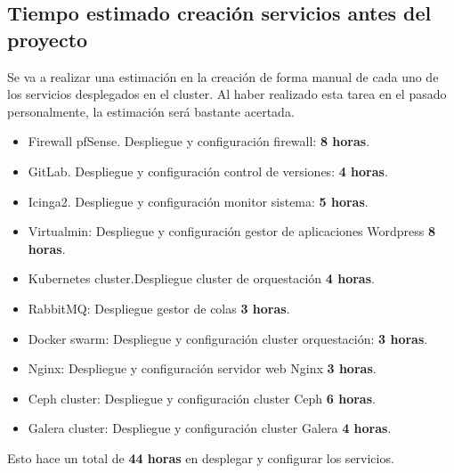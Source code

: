 \subsection{Tiempo estimado creación servicios antes del proyecto}
        \begin{text}
                Se va a realizar una estimación en la creación de forma manual de cada uno de los servicios desplegados en el cluster. Al haber realizado esta tarea en el pasado personalmente, la estimación será bastante acertada.
                \clearpage
                \begin{itemize}
                        \item Firewall pfSense. Despliegue y configuración firewall: \textbf{8 horas}.
                        \item GitLab. Despliegue y configuración control de versiones: \textbf{4 horas}.
                        \item Icinga2. Despliegue y configuración monitor sistema: \textbf{5 horas}.
                        \item Virtualmin: Despliegue y configuración gestor de aplicaciones Wordpress \textbf{8 horas}.
                        \item Kubernetes cluster.Despliegue cluster de orquestación \textbf{4 horas}.
                        \item RabbitMQ: Despliegue gestor de colas \textbf{3 horas}.
                        \item Docker swarm: Despliegue y configuración cluster orquestación: \textbf{3 horas}.
                        \item Nginx: Despliegue y configuración servidor web Nginx \textbf{3 horas}.
                        \item Ceph cluster: Despliegue y configuración cluster Ceph \textbf{6 horas}.
                        \item Galera cluster: Despliegue y configuración cluster Galera \textbf{4 horas}.
                \end{itemize}
        Esto hace un total de \textbf{44 horas} en desplegar y configurar los servicios.
        \end{text}

